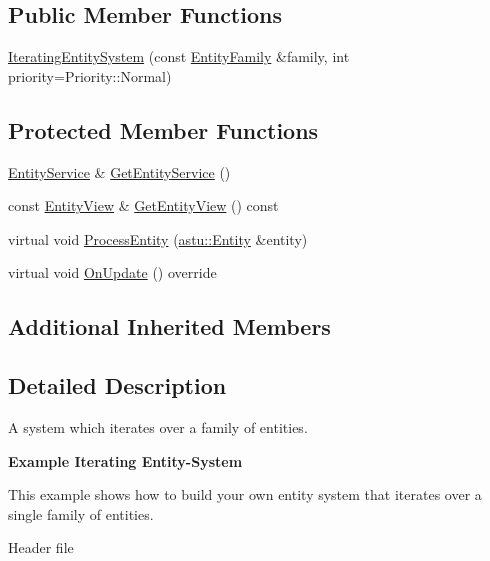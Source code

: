\subsection*{Public Member Functions}
\begin{DoxyCompactItemize}
\item 
\hyperlink{classastu_1_1IteratingEntitySystem_a309f14cfea4b5786ca3e41907f3fb41d}{Iterating\+Entity\+System} (const \hyperlink{classastu_1_1EntityFamily}{Entity\+Family} \&family, int priority=Priority\+::\+Normal)
\end{DoxyCompactItemize}
\subsection*{Protected Member Functions}
\begin{DoxyCompactItemize}
\item 
\hyperlink{classastu_1_1EntityService}{Entity\+Service} \& \hyperlink{classastu_1_1IteratingEntitySystem_a10b0a3e3be8eb0121b8c864144cb0ff9}{Get\+Entity\+Service} ()
\item 
const \hyperlink{group__ecs__group_gace2fb790b86c3908a65e4222f7ac2f4e}{Entity\+View} \& \hyperlink{classastu_1_1IteratingEntitySystem_ac5eff21df99058f0a4174257460c28e2}{Get\+Entity\+View} () const
\item 
virtual void \hyperlink{classastu_1_1IteratingEntitySystem_a76c7d21da428aa7a6435dc3692fbe6f2}{Process\+Entity} (\hyperlink{classastu_1_1Entity}{astu\+::\+Entity} \&entity)
\item 
virtual void \hyperlink{classastu_1_1IteratingEntitySystem_a7534ceb189ea282024bb9917cc244e94}{On\+Update} () override
\end{DoxyCompactItemize}
\subsection*{Additional Inherited Members}


\subsection{Detailed Description}
A system which iterates over a family of entities.

{\bfseries Example Iterating Entity-\/\+System}

This example shows how to build your own entity system that iterates over a single family of entities.

Header file


